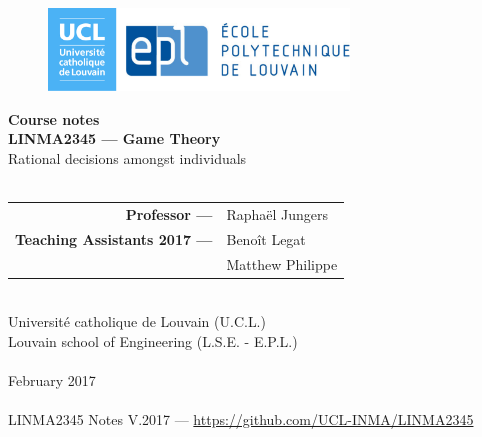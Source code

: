 \ifx \globalmark \undefined %

\else 	
\fi



\begin{titlepage}
\begin{center}



\vfill

\begin{figure}[!ht]
\centering
\includegraphics[width = 8cm]{Logo_UCL-EPL.eps}
\end{figure}







{ \bfseries Course notes }
\hrulefill\\[0.5cm]
\large{\textbf{LINMA2345 --- Game Theory}\\
Rational decisions amongst individuals} \\
\hrulefill\\[0.5cm]


\vfill
\vfill
\parbox[H][][c]{\textwidth}
	{
	\begin{tabular}{rl}
	\textbf{Professor ---} &  Rapha\"el Jungers \\	 		
	\textbf{Teaching Assistants 2017 ---} 	 &	Beno\^it Legat \\	
		     &	Matthew Philippe 	
	\end{tabular}
	}\par
	



%
$\,$\\[1cm]


Universit\'e catholique de Louvain (U.C.L.)\\
Louvain school of Engineering (L.S.E. - E.P.L.)\\
$\,$\\
February 2017\\
$\,$\\
\tiny{LINMA2345 Notes V.2017 --- \url{https://github.com/UCL-INMA/LINMA2345}}
\end{center}

\end{titlepage}







